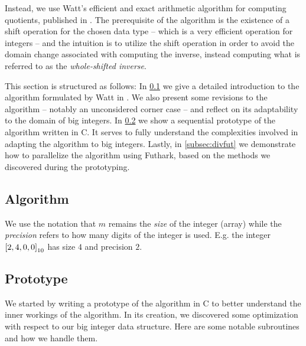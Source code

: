 Instead, we use Watt's efficient and exact arithmetic algorithm for computing
quotients, published in \cite{watt2023efficient}. The prerequisite of the
algorithm is the existence of a shift operation for the chosen data type -- which
is a very efficient operation for integers -- and the intuition is to utilize the
shift operation in order to avoid the domain change associated with computing
the inverse, instead computing what is referred to as the \textit{whole-shifted
  inverse}.

This section is structured as follows: In \ref{subsec:divalg} we give a detailed
introduction to the algorithm formulated by Watt in \cite{watt2023efficient}. We
also present some revisions to the algorithm -- notably an unconsidered corner
case -- and reflect on its adaptability to the domain of big integers. In
\ref{subsec:divproto} we show a sequential prototype of the algorithm written in
C. It serves to fully understand the complexities involved in adapting the
algorithm to big integers. Lastly, in \ref{subsec:divfut} we demonstrate how to
parallelize the algorithm using Futhark, based on the methods we discovered
during the prototyping.

\subsection{Algorithm}
\label{subsec:divalg}
{\red [TODO]}

We use the notation that $m$
remains the \textit{size} of the integer (array) while the \textit{precision}
refers to how many digits of the integer is used. E.g. the integer
$\mathtt{[}2, 4, 0, 0\mathtt{]}_{10}$ has size $4$ and precision $2$.

\subsection{Prototype}
\label{subsec:divproto}
{\red [TODO]}

We started by writing a prototype of the algorithm in C to better understand the
inner workings of the algorithm. In its creation, we discovered some
optimization with respect to our big integer data structure. Here are some
notable subroutines and how we handle them.

